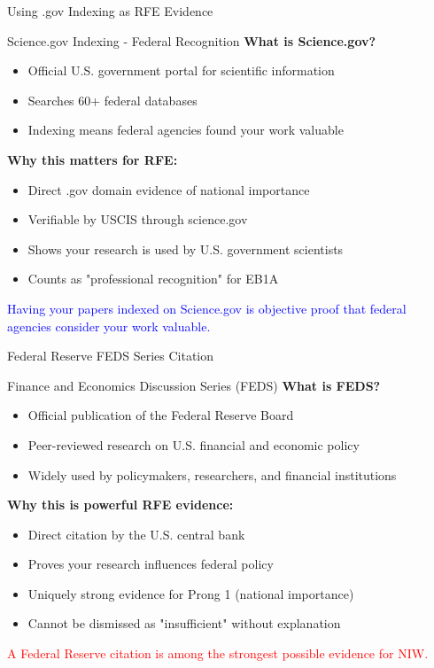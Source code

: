 \documentclass[11pt]{beamer}
\begin{document}
	
	\begin{frame}{Using .gov Indexing as RFE Evidence}
		\scriptsize
		\begin{block}{Science.gov Indexing - Federal Recognition}
			\textbf{What is Science.gov?}
			\begin{itemize}
				\item Official U.S. government portal for scientific information
				\item Searches 60+ federal databases
				\item Indexing means federal agencies found your work valuable
			\end{itemize}
			\textbf{Why this matters for RFE:}
			\begin{itemize}
				\item Direct .gov domain evidence of national importance
				\item Verifiable by USCIS through science.gov
				\item Shows your research is used by U.S. government scientists
				\item Counts as "professional recognition" for EB1A
			\end{itemize}
			\textcolor{blue}{Having your papers indexed on Science.gov is objective proof that federal agencies consider your work valuable.}
		\end{block}
	\end{frame}
	
	\begin{frame}{Federal Reserve FEDS Series Citation}
		\scriptsize
		\begin{block}{Finance and Economics Discussion Series (FEDS)}
			\textbf{What is FEDS?}
			\begin{itemize}
				\item Official publication of the Federal Reserve Board
				\item Peer-reviewed research on U.S. financial and economic policy
				\item Widely used by policymakers, researchers, and financial institutions
			\end{itemize}
			\textbf{Why this is powerful RFE evidence:}
			\begin{itemize}
				\item Direct citation by the U.S. central bank
				\item Proves your research influences federal policy
				\item Uniquely strong evidence for Prong 1 (national importance)
				\item Cannot be dismissed as "insufficient" without explanation
			\end{itemize}
			\textcolor{red}{A Federal Reserve citation is among the strongest possible evidence for NIW.}
		\end{block}
	\end{frame}
	
\end{document}
